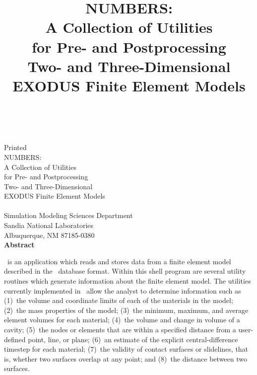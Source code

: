 \newif\ifdraft\draftfalse
\newif\ifsand\sandtrue

\SANDprintDate{\today}
\newcommand{\theTitle}{{\bold\sf NUMBERS}:\\
       A Collection of Utilities \\ 
       for Pre- and Postprocessing \\
       Two- and Three-Dimensional \\ 
       EXODUS Finite Element Models}
\title{\theTitle}
\ifsand
{}
\doCover
\newpage
\else
\SANDmarks{cover}
\setcounter{page}{3}
\fi


\begin{center}
\SANDnumVar\\
\SANDreleaseTypeVar\\
\ifdraft
Draft Date: \SANDprintDateVar\\
\else
Printed \SANDprintDateVar\\
\fi

\vspace{0.65in}
\theTitle\\
\vspace{0.65in}
\SANDauthorVar\\
Simulation Modeling Sciences Department\\
Sandia National Laboratories\\
Albuquerque, NM 87185-0380\\
\vspace*{.5in}
\textbf{Abstract}
\end{center}
\numbers\ is an application which reads and stores data from a finite
element model described in the \exo\ database format. Within this shell
program are several utility routines which generate information about
the finite element model.  The utilities currently implemented in
\numbers\ allow the analyst to determine information such as (1)~the
volume and coordinate limits of each of the materials in the model;
(2)~the mass properties of the model; (3)~the minimum, maximum, and
average element volumes for each material; (4)~the volume and change in
volume of a cavity; (5)~the nodes or elements that are within a
specified distance from a user-defined point, line, or plane; (6)~an
estimate of the explicit central-difference timestep for each material;
(7)~the validity of contact surfaces or slidelines, that is, whether two
surfaces overlap at any point; and (8)~the distance between two
surfaces. 
